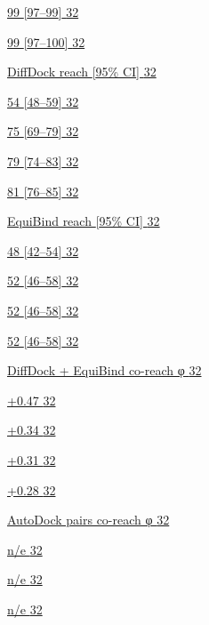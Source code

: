 \protect\hyperlink{_Toc235735906}{99 {[}97--99{]} \protect\hyperlink{_Toc235735906}{32}}

\protect\hyperlink{_Toc235735907}{99 {[}97--100{]} \protect\hyperlink{_Toc235735907}{32}}

\protect\hyperlink{_Toc235735908}{DiffDock reach {[}95\% CI{]} \protect\hyperlink{_Toc235735908}{32}}

\protect\hyperlink{_Toc235735909}{54 {[}48--59{]} \protect\hyperlink{_Toc235735909}{32}}

\protect\hyperlink{_Toc235735910}{75 {[}69--79{]} \protect\hyperlink{_Toc235735910}{32}}

\protect\hyperlink{_Toc235735911}{79 {[}74--83{]} \protect\hyperlink{_Toc235735911}{32}}

\protect\hyperlink{_Toc235735912}{81 {[}76--85{]} \protect\hyperlink{_Toc235735912}{32}}

\protect\hyperlink{_Toc235735913}{EquiBind reach {[}95\% CI{]} \protect\hyperlink{_Toc235735913}{32}}

\protect\hyperlink{_Toc235735914}{48 {[}42--54{]} \protect\hyperlink{_Toc235735914}{32}}

\protect\hyperlink{_Toc235735915}{52 {[}46--58{]} \protect\hyperlink{_Toc235735915}{32}}

\protect\hyperlink{_Toc235735916}{52 {[}46--58{]} \protect\hyperlink{_Toc235735916}{32}}

\protect\hyperlink{_Toc235735917}{52 {[}46--58{]} \protect\hyperlink{_Toc235735917}{32}}

\protect\hyperlink{_Toc235735918}{DiffDock + EquiBind co-reach φ \protect\hyperlink{_Toc235735918}{32}}

\protect\hyperlink{_Toc235735919}{+0.47 \protect\hyperlink{_Toc235735919}{32}}

\protect\hyperlink{_Toc235735920}{+0.34 \protect\hyperlink{_Toc235735920}{32}}

\protect\hyperlink{_Toc235735921}{+0.31 \protect\hyperlink{_Toc235735921}{32}}

\protect\hyperlink{_Toc235735922}{+0.28 \protect\hyperlink{_Toc235735922}{32}}

\protect\hyperlink{_Toc235735923}{AutoDock pairs co-reach φ \protect\hyperlink{_Toc235735923}{32}}

\protect\hyperlink{_Toc235735924}{n/e \protect\hyperlink{_Toc235735924}{32}}

\protect\hyperlink{_Toc235735925}{n/e \protect\hyperlink{_Toc235735925}{32}}

\protect\hyperlink{_Toc235735926}{n/e \protect\hyperlink{_Toc235735926}{32}}

